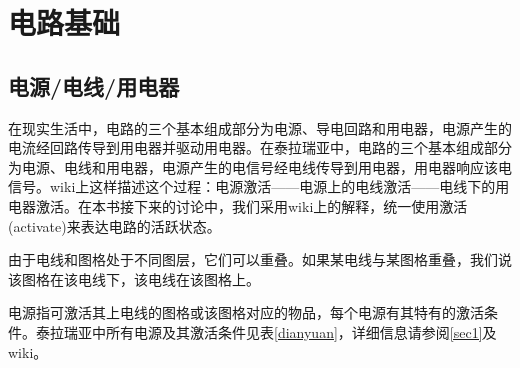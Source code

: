 \chapter{电路基础}\label{dianlujichu}

\section{电源/电线/用电器}

在现实生活中，电路的三个基本组成部分为电源、导电回路和用电器，电源产生的电流经回路传导到用电器并驱动用电器。在泰拉瑞亚中，电路的三个基本组成部分为电源、电线和用电器，电源产生的电信号经电线传导到用电器，用电器响应该电信号。wiki上这样描述这个过程：电源激活——电源上的电线激活——电线下的用电器激活。在本书接下来的讨论中，我们采用wiki上的解释，统一使用激活(activate)来表达电路的活跃状态。

由于电线和图格处于不同图层，它们可以重叠。如果某电线与某图格重叠，我们说该图格在该电线下，该电线在该图格上。

电源指可激活其上电线的图格或该图格对应的物品，每个电源有其特有的激活条件。泰拉瑞亚中所有电源及其激活条件见表\ref{dianyuan}，详细信息请参阅\autoref{sec1}及wiki。

